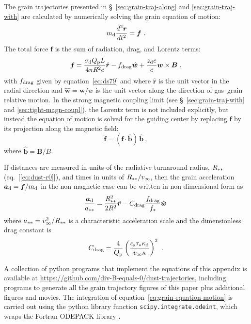 The grain trajectories presented in \S~\ref{sec:grain-traj-along} and
\ref{sec:grain-traj-with} are calculated by numerically solving the
grain equation of motion:
\begin{equation}
  \label{eq:grain-equation-motion}
  m_{\text{d}} \frac{d^2 \bm{r}}{d t^2} = \bm{f} \ .
\end{equation}
The total force \(\bm{f}\) is the sum of radiation, drag, and Lorentz
terms:
\begin{equation}
  \label{eq:total-force}
  \bm{f} = \frac{\sigma_{\text{d}} Q_{\text{p}} L}{4\pi R^2 c} \hat{\bm{r}}
  - f_{\text{drag}} \hat{\bm{w}}
  + \frac{z_{\text{d}} e}{c} \bm{w} \times \bm{B} \ ,
\end{equation}
with \(f_{\text{drag}}\) given by equation~\eqref{eq:ds79} and where
\(\hat{\bm{r}}\) is the unit vector in the radial direction and
\(\hat{\bm{w}} = \bm{w} / w\) is the unit vector along the direction
of gas--grain relative motion.  In the strong magnetic coupling limit
(see \S~\ref{sec:grain-traj-with} and \ref{sec:tight-magn-coupl}), the
Lorentz term is not included explicitly, but instead the equation of
motion is solved for the guiding center by replacing \(\bm{f}\) by its
projection along the magnetic field: 
\begin{equation}
  \label{eq:projected-force}
  \widetilde{\bm{f}} = (\bm{f} \cdot \hat{\bm{b}})  \, \hat{\bm{b}} \ ,
\end{equation}
where \(\hat{\bm{b}} = \bm{B} / B\).

If distances are measured in units of the radiative turnaround radius,
\(R_{**}\) (eq.~[\ref{eq:dust-r0}]), and times in units of
\(R_{**} / v_\infty\), then the grain acceleration
\(\bm{a}_{\text{d}} = \bm{f} / m_{\text{d}}\) in the non-magnetic case can be
written in non-dimensional form as
\begin{equation}
  \label{eq:grain-accelration}
  \frac{\bm{a}_{\text{d}}}{a_{**}}
  = \frac{R_{**}^2}{2 R^{2}} \hat{\bm{r}}
  - C_{\text{drag}} \frac{f_{\text{drag}}}{f_*} \hat{\bm{w}} \, 
\end{equation}
where \(a_{**} = v_\infty^2 / R_{**}\) is a characteristic
acceleration scale and the dimensionless drag constant is
\begin{equation}
  \label{eq:drag-constant}
  C_{\text{drag}} = \frac{4}{Q_{\text{p}}} \left(\frac{c_{\text{s}} \tau_* \kappa_{\text{d}}}{v_\infty \kappa}\right)^2 \ .
\end{equation}

A collection of python programs that implement the equations of this
appendix is available at
\url{https://github.com/div-B-equals-0/dust-trajectories}, including
programs to generate all the grain trajectory figures of this paper
plus additional figures and movies.  The integration of
equation~\eqref{eq:grain-equation-motion} is carried out using the
python library function \texttt{scipy.integrate.odeint}, which wraps
the Fortran ODEPACK library \citep{Hindmarsh:1983a, Jones:2001a}.

